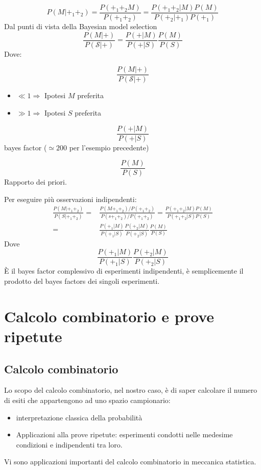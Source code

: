 \documentclass[11pt,a4paper]{book}
\begin{document}
\begin{equation}
P(M|+_1+_2) = \frac{P(+_1+_2M)}{P(+_1+_2)} = \frac{P(+_1+_2|M)P(M)}{P(+_2|+_1)P(+_1)}
\end{equation}
Dal punti di vista della Bayesian model selection
\begin{equation}
\frac{P(M|+)}{P(\mathcal{S}|+)} = \frac{P(+|M)}{P(+|S)}\frac{P(M)}{P(S)}
\end{equation}
Dove:
\begin{description}
\item \begin{equation}
\frac{P(M|+)}{P(\mathcal{S}|+)} 
\end{equation}
\begin{itemize}
\item $ \ll 1\Rightarrow$ Ipotesi $ M $ preferita
\item $ \gg 1\Rightarrow$ Ipotesi $ S $ preferita
\end{itemize}
\item 
\begin{equation}
\frac{P(+|M)}{P(+|S)}
\end{equation}
bayes factor ($ \simeq 200 $ per l'esempio precedente)
\item \begin{equation}
\frac{P(M)}{P(S)}
\end{equation}
Rapporto dei priori.
\end{description}
Per eseguire più osservazioni indipendenti:
\begin{align}
\frac{P(M|+_1+_2)}{P(S|+_1+_2)} =& \frac{P(M+_1+_2)/P(+_1+_2)}{P(s+_1+_2)/P(+_1+_2)} = \frac{P(+_1+_2|M)P(M)}{P(+_1+_2|S)P(S)}\\
= & \frac{P(+_1|M)}{P(+_1|S)} \frac{P(+_2|M)}{P(+_2|S)} \frac{P(M)}{P(S)}
\end{align}
Dove
\begin{equation}
\frac{P(+_1|M)}{P(+_1|S)} \frac{P(+_2|M)}{P(+_2|S)}
\end{equation}
\`{E} il bayes factor complessivo di esperimenti indipendenti, è semplicemente il prodotto del bayes factors dei singoli esperimenti.
\chapter{Calcolo combinatorio e prove ripetute} 
\section{Calcolo combinatorio}
Lo scopo del calcolo combinatorio, nel nostro caso, è di saper calcolare il numero di esiti che appartengono ad uno spazio campionario:
\begin{itemize}
\item interpretazione classica della probabilità
\item Applicazioni alla prove ripetute: esperimenti condotti nelle medesime condizioni e indipendenti tra loro.
\end{itemize}
Vi sono applicazioni importanti del calcolo combinatorio in meccanica statistica.
\end{document}
